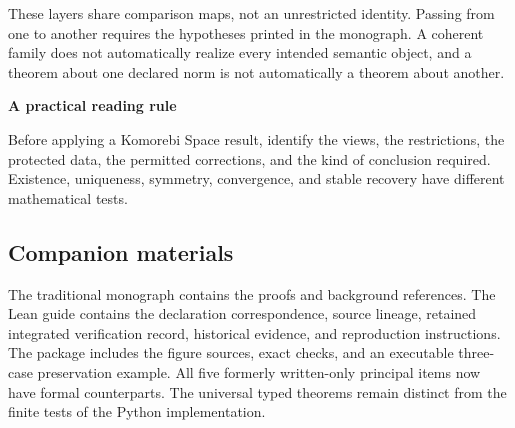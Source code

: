 \documentclass[11pt]{article}
\begin{document}
These layers share comparison maps, not an unrestricted identity. Passing from one to another requires the hypotheses printed in the monograph. A coherent family does not automatically realize every intended semantic object, and a theorem about one declared norm is not automatically a theorem about another.

\begin{insight}
\textbf{A practical reading rule}\par
Before applying a Komorebi Space result, identify the views, the restrictions, the protected data, the permitted corrections, and the kind of conclusion required. Existence, uniqueness, symmetry, convergence, and stable recovery have different mathematical tests.
\end{insight}

\subsection*{Companion materials}
The traditional monograph contains the proofs and background references. The Lean guide contains the declaration correspondence, source lineage, retained integrated verification record, historical evidence, and reproduction instructions. The package includes the figure sources, exact checks, and an executable three-case preservation example. All five formerly written-only principal items now have formal counterparts. The universal typed theorems remain distinct from the finite tests of the Python implementation.
\end{document}
